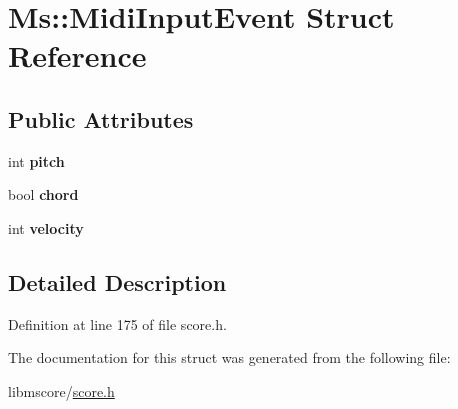 \hypertarget{struct_ms_1_1_midi_input_event}{}\section{Ms\+:\+:Midi\+Input\+Event Struct Reference}
\label{struct_ms_1_1_midi_input_event}
\subsection*{Public Attributes}
\begin{DoxyCompactItemize}
\item 
\mbox{\label{struct_ms_1_1_midi_input_event_a6b8831155a0bb92d7fdc0429ddc914e7}} 
int {\bfseries pitch}
\item 
\mbox{\label{struct_ms_1_1_midi_input_event_ac722e2a45f6bf0e70111f7ccf8509297}} 
bool {\bfseries chord}
\item 
\mbox{\label{struct_ms_1_1_midi_input_event_ad64a4c8a069d019aa6c9fdd1b4a365f0}} 
int {\bfseries velocity}
\end{DoxyCompactItemize}


\subsection{Detailed Description}


Definition at line 175 of file score.\+h.



The documentation for this struct was generated from the following file\+:\begin{DoxyCompactItemize}
\item 
libmscore/\hyperlink{score_8h}{score.\+h}\end{DoxyCompactItemize}
